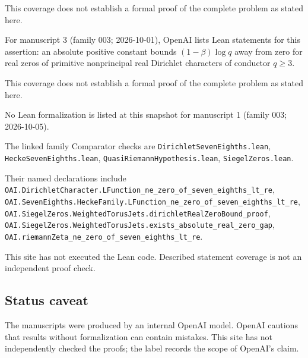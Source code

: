 \documentclass[11pt]{article}
\begin{document}
This coverage does not establish a formal proof of the complete problem as stated here.

For manuscript 3 (family 003; 2026-10-01), OpenAI lists Lean statements for this assertion: an absolute positive constant bounds $(1-\beta)\log q$ away from zero for real zeros of primitive nonprincipal real Dirichlet characters of conductor $q\ge3$.

This coverage does not establish a formal proof of the complete problem as stated here.

No Lean formalization is listed at this snapshot for manuscript 1 (family 003; 2026-10-05).

The linked family Comparator checks are \texttt{DirichletSevenEighths.lean}, \texttt{HeckeSevenEighths.lean}, \texttt{QuasiRiemannHypothesis.lean}, \texttt{SiegelZeros.lean}.

Their named declarations include \texttt{OAI.DirichletCharacter.LFunction\_ne\_zero\_of\_seven\_eighths\_lt\_re}, \texttt{OAI.SevenEighths.HeckeFamily.LFunction\_ne\_zero\_of\_seven\_eighths\_lt\_re}, \texttt{OAI.SiegelZeros.WeightedTorusJets.dirichletRealZeroBound\_proof}, \texttt{OAI.SiegelZeros.WeightedTorusJets.exists\_absolute\_real\_zero\_gap}, \texttt{OAI.riemannZeta\_ne\_zero\_of\_seven\_eighths\_lt\_re}.

This site has not executed the Lean code. Described statement coverage is not an independent proof check.

\subsection{Status caveat}
The manuscripts were produced by an internal OpenAI model. OpenAI cautions that results without formalization can contain mistakes. This site has not independently checked the proofs; the label records the scope of OpenAI's claim.
\end{document}

